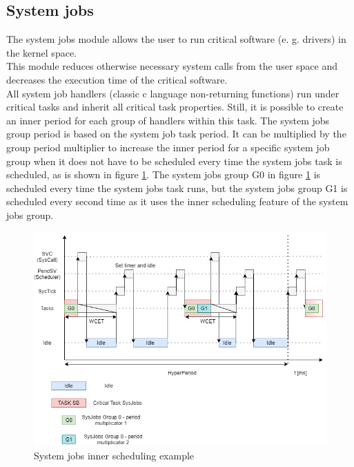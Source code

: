 \subsection{System jobs}
The system jobs module allows the user to run critical software (e. g. drivers) in the kernel space. \\
\indent This module reduces otherwise necessary system calls from the user space and decreases the execution time of the critical software.\\
\indent All system job handlers (classic c language non-returning functions) run under critical tasks and inherit all critical task properties. Still, it is possible to create an inner period for each group of handlers within this task. The system jobs group period is based on the system job task period. It can be multiplied by the group period multiplier to increase the inner period for a specific system job group when it does not have to be scheduled every time the system jobs task is scheduled, as is shown in figure \ref{fig:SysJobsScheduling}. The system jobs group G0 in figure \ref{fig:SysJobsScheduling} is scheduled every time the system jobs task runs, but the system jobs group G1 is scheduled every second time as it uses the inner scheduling feature of the system jobs group.

\begin{figure}[H]
\begin{center}
\includegraphics[width=1\textwidth]{images/sys_jobs_scheduling.png}
\caption{System jobs inner scheduling example}
\label{fig:SysJobsScheduling}
\end{center}
\end{figure}

